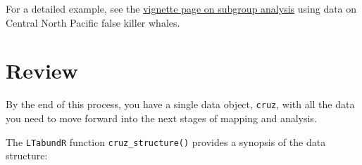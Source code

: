 \documentclass[
]{book}
\newenvironment{Shaded}{\begin{snugshade}}{\end{snugshade}}
\newcommand{\DecValTok}[1]{\textcolor[rgb]{0.00,0.00,0.81}{#1}}
\newcommand{\NormalTok}[1]{#1}
\newcommand{\SpecialCharTok}[1]{\textcolor[rgb]{0.81,0.36,0.00}{\textbf{#1}}}
\newcommand{\StringTok}[1]{\textcolor[rgb]{0.31,0.60,0.02}{#1}}
\begin{document}
\begin{Shaded}
\end{Shaded}

For a detailed example, see the \protect\hyperlink{subgroups2}{vignette page on subgroup analysis} using data on Central North Pacific false killer whales.

\hypertarget{review}{%
\section*{Review}\label{review}}

By the end of this process, you have a single data object, \texttt{cruz}, with all the data you need to move forward into the next stages of mapping and analysis.

The \texttt{LTabundR} function \texttt{cruz\_structure()} provides a synopsis of the data structure:
\end{document}
